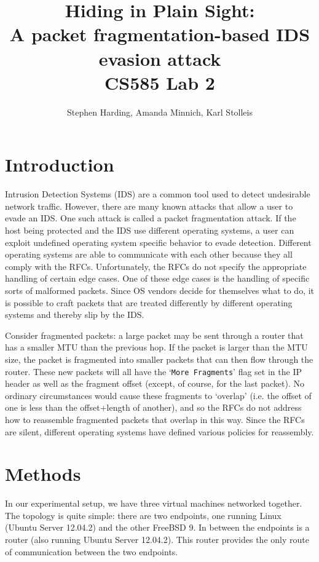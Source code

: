 \documentclass[]{article}
\begin{document}
\title{Hiding in Plain Sight: \\ 
\Large A packet fragmentation-based IDS evasion attack \\
\large CS585 Lab 2}
\author{Stephen Harding, Amanda Minnich, Karl Stolleis}

\maketitle
\newpage
\section{Introduction}

Intrusion Detection Systems (IDS) are a common tool used to detect undesirable 
network traffic. However, there are many known attacks that allow a user to 
evade an IDS. One such attack is called a packet fragmentation attack. If the 
host being protected and the IDS use different operating systems, a user can 
exploit undefined operating system specific behavior to evade detection. 
Different operating systems are able to communicate with each other because 
they all comply with the RFCs. Unfortunately, the RFCs do not specify the 
appropriate handling of certain edge cases. One of these edge cases is the 
handling of specific sorts of malformed packets. Since OS vendors decide for 
themselves what to do, it is possible to craft packets that are treated 
differently by different operating systems and thereby slip by the IDS.

Consider fragmented packets: a large packet may be sent through a router that 
has a smaller MTU than the previous hop. If the packet is larger than the MTU 
size, the packet is fragmented into smaller packets that can then flow through 
the router. These new packets will all have the `\texttt{More Fragments}' flag 
set in the IP header as well as the fragment offset (except, of course, for 
the last packet). No ordinary circumstances would cause these fragments to 
`overlap' (i.e. the offset of one is less than the offset+length of another), 
and so the RFCs do not address how to reassemble fragmented packets that 
overlap in this way. Since the RFCs are silent, different operating systems 
have defined various policies for reassembly.

\section{Methods}

In our experimental setup, we have three virtual machines networked together. 
The topology is quite simple: there are two endpoints, one running Linux 
(Ubuntu Server 12.04.2) and the other FreeBSD 9. In between the 
endpoints is a router (also running Ubuntu Server 12.04.2). This 
router provides the only route of communication between the two endpoints.
\end{document}
